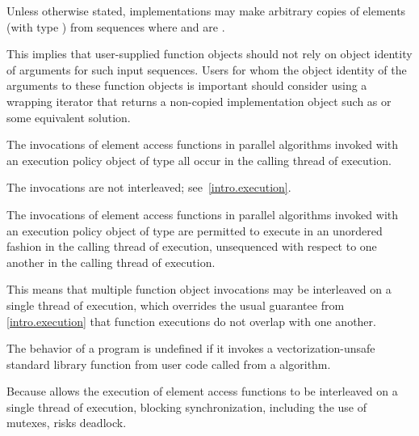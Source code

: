 \pnum
Unless otherwise stated, implementations may make arbitrary copies of elements
(with type ) from sequences
where 
and  are .
\begin{note}
This implies that user-supplied function objects should not rely on
object identity of arguments for such input sequences.
Users for whom the object identity of the arguments to these function objects
is important should consider using a wrapping iterator
that returns a non-copied implementation object
such as 
or some equivalent solution.
\end{note}

\pnum
The invocations of element access functions in parallel algorithms invoked with
an execution policy object of type  all occur
in the calling thread of execution.
\begin{note}
The invocations are not interleaved; see~\ref{intro.execution}.
\end{note}

\pnum
The invocations of element access functions in parallel algorithms invoked with
an execution policy object of type 
are permitted to execute in an unordered fashion
in the calling thread of execution,
unsequenced with respect to one another in the calling thread of execution.
\begin{note}
This means that multiple function object invocations
may be interleaved on a single thread of execution,
which overrides the usual guarantee from \ref{intro.execution}
that function executions do not overlap with one another.
\end{note}
The behavior of a program is undefined if
it invokes a vectorization-unsafe standard library function
from user code
called from a  algorithm.
\begin{note}
Because  allows
the execution of element access functions
to be interleaved on a single thread of execution,
blocking synchronization, including the use of mutexes, risks deadlock.
\end{note}

